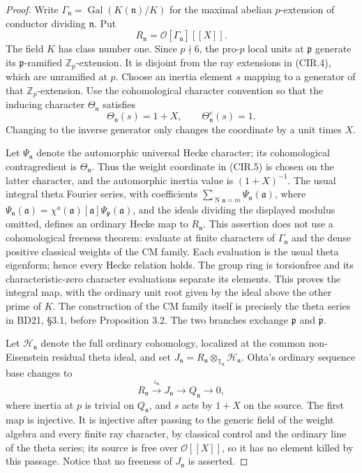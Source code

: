 \begin{proof}
Write \(\Gamma_{\mathfrak n}=\operatorname{Gal}(K(\mathfrak n)/K)\)
for the maximal abelian \(p\)-extension of conductor dividing
\(\mathfrak n\).  Put
\[
 R_{\mathfrak n}=\mathcal O[\Gamma_{\mathfrak n}][[X]].  \tag{CIR.4}
\]
The field \(K\) has class number one.  Since \(p\nmid6\),
the pro-\(p\) local units at \(\mathfrak p\) generate its
\(\mathfrak p\)-ramified \(\mathbb Z_p\)-extension.
It is disjoint from the ray extensions in (CIR.4), which are
unramified at \(p\).  Choose an inertia element \(s\) mapping
to a generator of that \(\mathbb Z_p\)-extension.  Use the
cohomological character convention so that the inducing
character \(\Theta_{\mathfrak n}\) satisfies
\[
 \Theta_{\mathfrak n}(s)=1+X,\qquad
 \Theta_{\mathfrak n}^{c}(s)=1.                        \tag{CIR.5}
\]
Changing to the inverse generator only changes the coordinate
by a unit times \(X\).

Let \(\Psi_{\mathfrak n}\) denote the automorphic universal
Hecke character; its cohomological contragredient is
\(\Theta_{\mathfrak n}\).  Thus the weight coordinate in
(CIR.5) is chosen on the latter character, and the automorphic
inertia value is \((1+X)^{-1}\).
The usual integral theta Fourier series, with coefficients
\(\sum_{\operatorname N\mathfrak a=m}
\Psi_{\mathfrak n}(\mathfrak a)\), where
\(\Psi_{\mathfrak n}(\mathfrak a)
=\chi^a(\mathfrak a)[\mathfrak a]
\Psi_{\mathfrak p}(\mathfrak a)\),
and the ideals dividing the displayed modulus omitted, defines
an ordinary Hecke map to \(R_{\mathfrak n}\).
This assertion does not use a cohomological freeness theorem:
evaluate at finite characters of \(\Gamma_{\mathfrak n}\)
and the dense positive classical weights of the CM family.
Each evaluation is the usual theta eigenform; hence every
Hecke relation holds.  The group ring is torsionfree and its
characteristic-zero character evaluations separate its elements.
This proves the integral map, with the ordinary unit root
given by the ideal above the other prime of \(K\).
The construction of the CM family itself is precisely the
theta series in BD21, \S3.1, before Proposition 3.2.
The two branches exchange \(\mathfrak p\) and
\(\overline{\mathfrak p}\).

Let \(\mathcal H_{\mathfrak n}\) denote the full ordinary
cohomology, localized at the common non-Eisenstein residual
theta ideal, and set
\(J_{\mathfrak n}=R_{\mathfrak n}\otimes_{\mathbb T_{\mathfrak n}}
\mathcal H_{\mathfrak n}\).
Ohta's ordinary sequence base changes to
\[
 R_{\mathfrak n}\xrightarrow{\iota_{\mathfrak n}}
 J_{\mathfrak n}\longrightarrow Q_{\mathfrak n}
 \longrightarrow0,                                   \tag{CIR.6}
\]
where inertia at \(p\) is trivial on \(Q_{\mathfrak n}\), and
\(s\) acts by \(1+X\) on the source.  The first map is
injective.  It is injective after passing to the generic field
of the weight algebra and every finite ray character, by
classical control and the ordinary line of the theta series;
its source is free over \(\mathcal O[[X]]\), so it has no
element killed by this passage.  Notice that no freeness of
\(J_{\mathfrak n}\) is asserted.


\end{proof}
